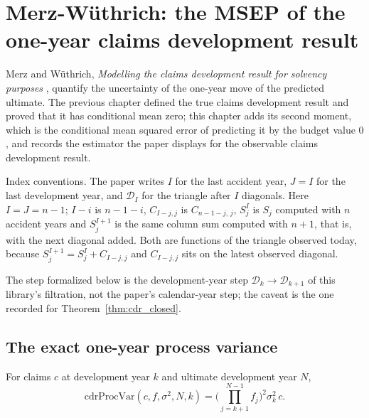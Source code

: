\chapter{Merz-Wüthrich: the MSEP of the one-year claims development result}

Merz and Wüthrich, \emph{Modelling the claims development result for solvency purposes}
\cite{MerzWuethrich2008}, quantify the uncertainty of the
one-year move of the predicted ultimate. The previous chapter defined the true claims development
result and proved that it has conditional mean zero; this chapter adds its second moment, which is
the conditional mean squared error of predicting it by the budget value $0$, and records the
estimator the paper displays for the observable claims development result.

Index conventions. The paper writes $I$ for the last accident year, $J = I$ for the last
development year, and $\mathcal{D}_I$ for the triangle after $I$ diagonals. Here $I = J = n-1$;
$I - i$ is $n-1-i$, $C_{I-j,j}$ is $C_{n-1-j,\,j}$, $S^I_j$ is $S_j$ computed with $n$ accident
years and $S^{I+1}_j$ is the same column sum computed with $n+1$, that is, with the next diagonal
added. Both are functions of the triangle observed today, because
$S^{I+1}_j = S^I_j + C_{I-j,j}$ and $C_{I-j,j}$ sits on the latest observed diagonal.

The step formalized below is the development-year step $\mathcal{D}_k \to \mathcal{D}_{k+1}$ of
this library's filtration, not the paper's calendar-year step; the caveat is the one recorded for
Theorem~\ref{thm:cdr_closed}.

\section{The exact one-year process variance}

\begin{definition}\label{def:cdrProcVar}\leanok
{}
For claims $c$ at development year $k$ and ultimate development year $N$,
\[
  \mathrm{cdrProcVar}(c, f, \sigma^2, N, k) = \Big(\prod_{j=k+1}^{N-1} f_j\Big)^2 \sigma_k^2\, c .
\]
\end{definition}


